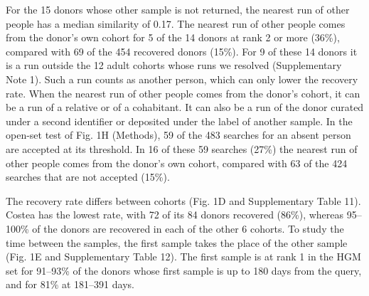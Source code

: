 \documentclass[11pt,a4paper]{article}
\begin{document}
For the 15 donors whose other sample is not returned, the nearest run of other people has a median similarity of 0.17. The nearest run of other people comes from the donor's own cohort for 5 of the 14 donors at rank 2 or more (36\%), compared with 69 of the 454 recovered donors (15\%). For 9 of these 14 donors it is a run outside the 12 adult cohorts whose runs we resolved (Supplementary Note 1). Such a run counts as another person, which can only lower the recovery rate. When the nearest run of other people comes from the donor's cohort, it can be a run of a relative or of a cohabitant. It can also be a run of the donor curated under a second identifier or deposited under the label of another sample.
In the open-set test of Fig. 1H (Methods), 59 of the 483 searches for an absent person are accepted at its threshold. In 16 of these 59 searches (27\%) the nearest run of other people comes from the donor's own cohort, compared with 63 of the 424 searches that are not accepted (15\%).

The recovery rate differs between cohorts (Fig. 1D and Supplementary Table 11). Costea has the lowest rate, with 72 of its 84 donors recovered (86\%), whereas 95--100\% of the donors are recovered in each of the other 6 cohorts. To study the time between the samples, the first sample takes the place of the other sample (Fig. 1E and Supplementary Table 12). The first sample is at rank 1 in the HGM set for 91--93\% of the donors whose first sample is up to 180 days from the query, and for 81\% at 181--391 days.
\end{document}
